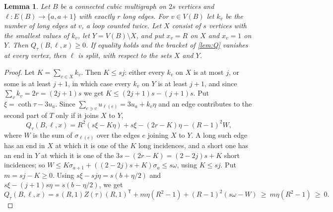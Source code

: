 \documentclass[11pt]{article}
\newtheorem{lemma}[theorem]{Lemma}
\theoremstyle{definition}
\theoremstyle{remark}
\begin{document}
\begin{lemma}\label{lem:cut}
Let $B$ be a connected cubic multigraph on $2s$ vertices and $\ell\colon E(B)\to\{a,a+1\}$ with exactly $r$ long
edges. For $v\in V(B)$ let $k_v$ be the number of long edges at $v$, a loop counted twice. Let $X$ consist of $s$
vertices with the smallest values of $k_v$, let $Y=V(B)\setminus X$, and put $x_v=R$ on $X$ and $x_v=1$ on $Y$. Then
$Q_\tau(B,\ell,x)\ge0$. If equality holds and the bracket of \cref{lem:Q} vanishes at every vertex, then $\ell$ is split,
with respect to the sets $X$ and $Y$.
\end{lemma}

\begin{proof}
Let $K=\sum_{v\in X}k_v$. Then $K\le sj$: either every $k_v$ on $X$ is at most $j$, or some is at least $j+1$, in which
case every $k_v$ on $Y$ is at least $j+1$, and since $\sum_vk_v=2r=(2j+1)s$ we get $K\le(2j+1)s-(j+1)s$. Put
$\xi=\coth\tau-3u_a$. Since $\sum_{e\ni v}u_{\ell(e)}=3u_a+k_v\eta$ and an edge contributes to the second part of $T$
only if it joins $X$ to $Y$,
\[
Q_\tau(B,\ell,x)=R^2(s\xi-K\eta)+s\xi-(2r-K)\eta-(R-1)^2W,
\]
where $W$ is the sum of $\sigma_{\ell(e)}$ over the edges $e$ joining $X$ to $Y$. A long such edge has an end in $X$ at
which it is one of the $K$ long incidences, and a short one has an end in $Y$ at which it is one of the
$3s-(2r-K)=(2-2j)s+K$ short incidences; so $W\le K\sigma_{a+1}+((2-2j)s+K)\sigma_a\le s\omega$, using $K\le sj$. Put
$m=sj-K\ge0$. Using $s\xi-sj\eta=s(b+\eta/2)$ and $s\xi-(j+1)s\eta=s(b-\eta/2)$, we get
\[
Q_\tau(B,\ell,x)=s\,(R,1)Z(\tau)(R,1)^{\mathsf T}+m\eta(R^2-1)+(R-1)^2(s\omega-W)\ \ge\ m\eta(R^2-1)\ \ge\ 0 .
\]


\end{proof}
\end{document}
